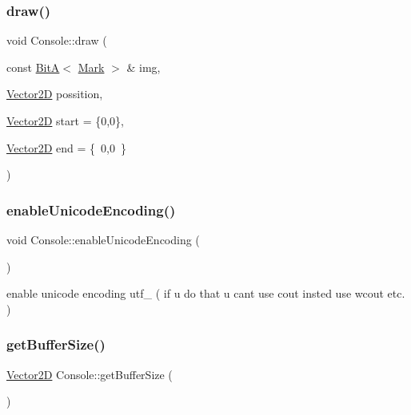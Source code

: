 \subsubsection{\texorpdfstring{draw()}{draw()}\hspace{0.1cm}{\footnotesize\ttfamily [8/8]}}
{\footnotesize\ttfamily void Console\+::draw (\begin{DoxyParamCaption}\item[{const \mbox{\hyperlink{classsc_1_1_bit_a}{BitA}}$<$ \mbox{\hyperlink{classsc_1_1_mark}{Mark}} $>$ \&}]{img,  }\item[{\mbox{\hyperlink{classsc_1_1_vector2_d}{Vector2D}}}]{possition,  }\item[{\mbox{\hyperlink{classsc_1_1_vector2_d}{Vector2D}}}]{start = {\ttfamily \{0,0\}},  }\item[{\mbox{\hyperlink{classsc_1_1_vector2_d}{Vector2D}}}]{end = {\ttfamily \{~0,0~\}} }\end{DoxyParamCaption})}

\mbox{\label{classsc_1_1_console_abd46f91b6a7bb1f349bac8ac95492efc}} 
\subsubsection{\texorpdfstring{enableUnicodeEncoding()}{enableUnicodeEncoding()}}
{\footnotesize\ttfamily void Console\+::enable\+Unicode\+Encoding (\begin{DoxyParamCaption}{ }\end{DoxyParamCaption})}



enable unicode encoding utf\+\_ ( if u do that u cant use cout insted use wcout etc. ) 

\mbox{\label{classsc_1_1_console_a80a3d34908aa888b1580de2ff6c8987f}} 
\subsubsection{\texorpdfstring{getBufferSize()}{getBufferSize()}}
{\footnotesize\ttfamily \mbox{\hyperlink{classsc_1_1_vector2_d}{Vector2D}} Console\+::get\+Buffer\+Size (\begin{DoxyParamCaption}{ }\end{DoxyParamCaption})}

